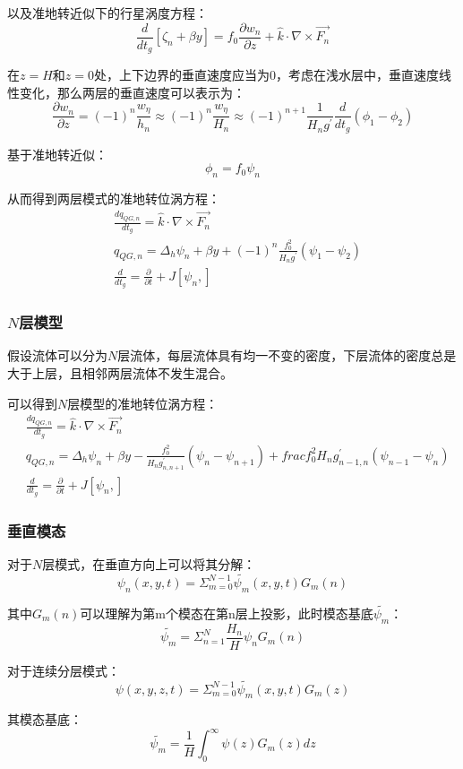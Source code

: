 \documentclass{article}
\begin{document}
以及准地转近似下的行星涡度方程：
$$\frac{d}{dt_g}[\zeta_n+\beta y]=f_0\frac{\partial w_n}{\partial z}+\hat{k}\cdot\nabla\times\vec{F_n}$$

在$z=H$和$z=0$处，上下边界的垂直速度应当为0，考虑在浅水层中，垂直速度线性变化，那么两层的垂直速度可以表示为：
$$\frac{\partial w_n}{\partial z}=(-1)^n\frac{w_\eta}{h_n}\approx(-1)^n\frac{w_\eta}{H_n}\approx(-1)^{n+1}\frac{1}{H_ng^{\prime}}\frac{d}{dt_g}(\phi_1-\phi_2)$$

基于准地转近似：
$$\phi_n=f_0\psi_n$$

从而得到两层模式的准地转位涡方程：
\begin{align}
    &\frac{dq_{QG,n}}{dt_g} = \hat{k}\cdot\nabla\times\vec{F_n} \\
    &q_{QG,n} = \Delta_h \psi_n + \beta y + (-1)^{n}\frac{f_0^2}{H_ng^{\prime}}(\psi_1-\psi_2)\\
    &\frac{d}{dt_g} = \frac{\partial }{\partial t} + J[\psi_n, ]
\end{align}


\subsubsection{$N$层模型}
假设流体可以分为$N$层流体，每层流体具有均一不变的密度，下层流体的密度总是大于上层，且相邻两层流体不发生混合。

可以得到$N$层模型的准地转位涡方程：
\begin{align}
    &\frac{dq_{QG,n}}{dt_g} = \hat{k}\cdot\nabla\times\vec{F_n} \\
    &q_{QG,n} = \Delta_h \psi_n + \beta y - \frac{f_0^2}{H_ng^{\prime}_{n,n+1}}(\psi_n-\psi_{n+1}) + frac{f_0^2}{H_ng^{\prime}_{n-1,n}}(\psi_{n-1}-\psi_{n}) \\
    &\frac{d}{dt_g} = \frac{\partial }{\partial t} + J[\psi_n, ]
\end{align}

\subsubsection{垂直模态}
对于$N$层模式，在垂直方向上可以将其分解：
$$\psi_n(x,y,t) = \Sigma_{m=0}^{N-1}\tilde{\psi_m}(x,y,t)G_m(n)$$

其中$G_m(n)$可以理解为第m个模态在第n层上投影，此时模态基底$\tilde{\psi_m}$：
$$\tilde{\psi_m}=\Sigma_{n=1}^{N}\frac{H_n}{H}\psi_nG_m(n)$$

对于连续分层模式：
$$\psi(x,y,z,t) = \Sigma_{m=0}^{N-1}\tilde{\psi_m}(x,y,t)G_m(z)$$

其模态基底：
$$\tilde{\psi_m}=\frac{1}{H}\int_{0}^{\infty}\psi(z)G_m(z)dz$$
\end{document}
